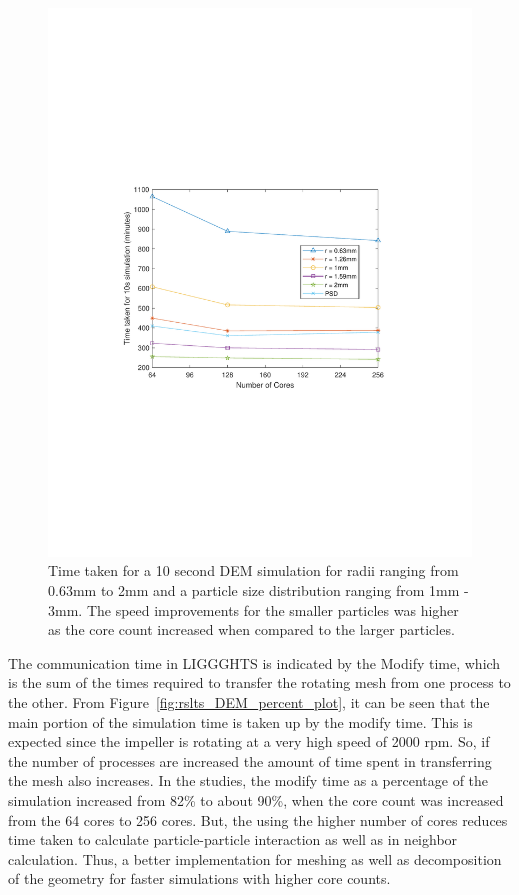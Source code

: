 \documentclass[preprint,11pt,authoryear]{elsarticle}
\begin{document}
\begin{figure}
\centering
\includegraphics[scale=0.85]{rslsts_DEM_alldia_timing_mtlb.pdf}
\caption{ Time taken for a 10 second DEM simulation for radii ranging from
 0.63mm to 2mm and a particle size distribution ranging from 1mm - 3mm. The speed improvements 
 for the smaller particles was higher as the core count increased when compared to the larger particles.}
\label{fig:rslts_DEM_timing_studies}
\end{figure}

The communication time in LIGGGHTS is indicated by the Modify time, which is the sum of the 
times required to transfer the rotating mesh from one process to the other. From Figure~\ref{fig:rslts_DEM_percent_plot}, it can be seen that the main portion of the simulation time is taken up by 
the modify time. This is expected since the impeller is rotating at a very high speed of 2000 rpm. So, if 
the number of processes are increased the amount of time spent in transferring the mesh also 
increases. In the studies, the modify time as a percentage of the simulation increased from 82\% to 
about 90\%, when the core count was increased from the 64 cores to 256 cores. But, the using the 
higher number of cores reduces time taken to calculate particle-particle interaction as well as in 
neighbor calculation. Thus, a better implementation for meshing as well as decomposition of the 
geometry for faster simulations with higher core counts.
\end{document}
